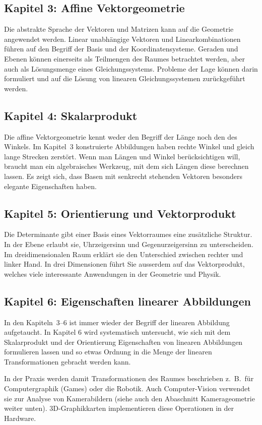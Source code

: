 \subsection*{Kapitel 3: Affine Vektorgeometrie}
Die abstrakte Sprache der Vektoren und Matrizen kann auf die Geometrie
angewendet werden.
Linear unabhängige Vektoren und Linearkombinationen führen auf den
Begriff der Basis und der Koordinatensysteme.
Geraden und Ebenen können einerseits als Teilmengen des Raumes
betrachtet werden, aber auch als Lösungsmenge eines Gleichungssystems.
Probleme der Lage können darin formuliert und auf die Lösung von
linearen Gleichungssystemen zurückgeführt werden.

\subsection*{Kapitel 4: Skalarprodukt}
Die affine Vektorgeometrie kennt weder den Begriff der Länge noch den
des Winkels.
Im Kapitel~3 konstruierte Abbildungen haben rechte Winkel und gleich
lange Strecken zerstört.
Wenn man Längen und Winkel berücksichtigen will, braucht man ein
algebraisches Werkzeug, mit dem sich Längen diese berechnen lassen.
Es zeigt sich, dass Basen mit senkrecht stehenden Vektoren besonders
elegante Eigenschaften haben.

\subsection*{Kapitel 5: Orientierung und Vektorprodukt}
Die Determinante gibt einer Basis eines Vektorraumes eine zusätzliche
Struktur.
In der Ebene erlaubt sie, Uhrzeigersinn und Gegenurzeigersinn zu 
unterscheiden.
Im dreidimensionalen Raum erklärt sie den Unterschied zwischen
rechter und linker Hand.
In drei Dimensionen führt Sie ausserdem auf das Vektorprodukt, welches
viele interessante Anwendungen in der Geometrie und Physik.

\subsection*{Kapitel 6: Eigenschaften linearer Abbildungen}
In den Kapiteln~3--6 ist immer wieder der Begriff der linearen
Abbildung aufgetaucht.
In Kapitel 6 wird systematisch untersucht, wie sich mit dem Skalarprodukt
und der Orientierung Eigenschaften von linearen Abbildungen formulieren
lassen
und so etwas Ordnung in die Menge der linearen Transformationen
gebracht werden kann.

In der Praxis werden damit Transformationen des Raumes beschrieben
z.~B.~für Computergraphik (Games) oder die Robotik.
Auch Computer-Vision verwendet sie zur Analyse von Kamerabildern
(siehe auch den Abaschnitt Kamerageometrie weiter unten).
3D-Graphikkarten implementieren diese Operationen in der Hardware.


